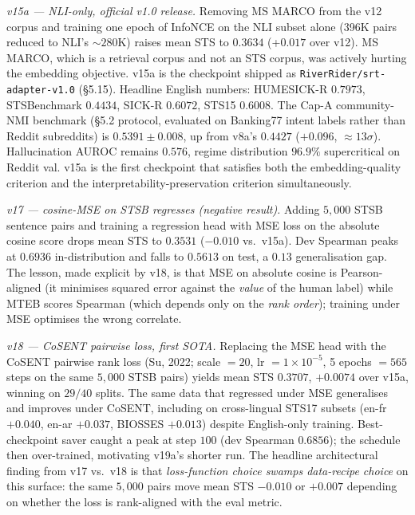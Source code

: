 \documentclass[
  11pt]{article}
\begin{document}
\emph{v15a --- NLI-only, official v1.0 release.} Removing MS MARCO from
the v12 corpus and training one epoch of InfoNCE on the NLI subset alone
(396K pairs reduced to NLI's \(\sim 280\)K) raises mean STS to
\(0.3634\) (+\(0.017\) over v12). MS MARCO, which is a retrieval corpus
and not an STS corpus, was actively hurting the embedding objective.
v15a is the checkpoint shipped as \texttt{RiverRider/srt-adapter-v1.0}
(§5.15). Headline English numbers: HUMESICK-R \(0.7973\), STSBenchmark
\(0.4434\), SICK-R \(0.6072\), STS15 \(0.6008\). The Cap-A community-NMI
benchmark (§5.2 protocol, evaluated on Banking77 intent labels rather
than Reddit subreddits) is \(0.5391 \pm 0.008\), up from v8a's
\(0.4427\) (\(+0.096\), \(\approx 13\sigma\)). Hallucination AUROC
remains \(0.576\), regime distribution \(96.9\%\) supercritical on
Reddit val. v15a is the first checkpoint that satisfies both the
embedding-quality criterion and the interpretability-preservation
criterion simultaneously.

\emph{v17 --- cosine-MSE on STSB regresses (negative result).} Adding
\(5{,}000\) STSB sentence pairs and training a regression head with MSE
loss on the absolute cosine score drops mean STS to \(0.3531\)
(\(-0.010\) vs.~v15a). Dev Spearman peaks at \(0.6936\) in-distribution
and falls to \(0.5613\) on test, a \(0.13\) generalisation gap. The
lesson, made explicit by v18, is that MSE on absolute cosine is
Pearson-aligned (it minimises squared error against the \emph{value} of
the human label) while MTEB scores Spearman (which depends only on the
\emph{rank order}); training under MSE optimises the wrong correlate.

\emph{v18 --- CoSENT pairwise loss, first SOTA.} Replacing the MSE head
with the CoSENT pairwise rank loss (Su, 2022; scale \(= 20\), lr
\(= 1\times 10^{-5}\), 5 epochs \(= 565\) steps on the same \(5{,}000\)
STSB pairs) yields mean STS \(0.3707\), \(+0.0074\) over v15a, winning
on \(29/40\) splits. The same data that regressed under MSE generalises
and improves under CoSENT, including on cross-lingual STS17 subsets
(en-fr \(+0.040\), en-ar \(+0.037\), BIOSSES \(+0.013\)) despite
English-only training. Best-checkpoint saver caught a peak at step
\(100\) (dev Spearman \(0.6856\)); the schedule then over-trained,
motivating v19a's shorter run. The headline architectural finding from
v17 vs.~v18 is that \emph{loss-function choice swamps data-recipe
choice} on this surface: the same \(5{,}000\) pairs move mean STS
\(-0.010\) or \(+0.007\) depending on whether the loss is rank-aligned
with the eval metric.
\end{document}

